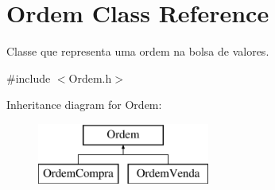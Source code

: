 \hypertarget{class_ordem}{}\section{Ordem Class Reference}
\label{class_ordem}


Classe que representa uma ordem na bolsa de valores.  




{\ttfamily \#include $<$Ordem.\+h$>$}

Inheritance diagram for Ordem\+:\begin{figure}[H]
\begin{center}
\leavevmode
\includegraphics[height=2.000000cm]{class_ordem}
\end{center}
\end{figure}
